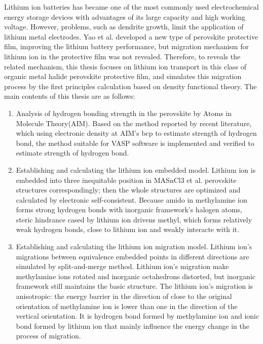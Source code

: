 \begin{eabstract}
Lithium ion batteries has became one of the most commonly used electrochemical energy storage devices with advantages of its large capacity and high working voltage. However, problems, such as dendrite growth, limit the application of lithium metal electrodes.
Yao et al. developed a new type of  perovskite protective film, improving the lithium battery performance, but migration mechanism for lithium ion in the protective film was not revealed.
Therefore, to reveals the related mechanism, this thesis focuses on lithium ion transport in this class of organic metal halide perovskite protective film, and simulates this migration process by the first principles calculation based on density functional theory.
The main contents of this thesis are as follows:
\begin{enumerate}
    \item Analysis of hydrogen bonding strength in the perovskite by Atoms in Molecule Theory(AIM). Based on the method reported by recent literature, which using electronic density at AIM's bcp to estimate strength of hydrogen bond, the method suitable for VASP software is implemented and verified to estimate strength of hydrogen bond.
    \item Establishing and calculating the lithium ion embedded model. Lithium ion is embedded into three inequitable position in MASnCl3 et al. perovskite structures correspondingly; then the whole structures are optimized and calculated by electronic self-consistent. Because amido in methylamine ion forms strong hydrogen bonds with inorganic framework's halogen atoms, steric hindrance cased by lithium ion drivens methyl, which forms relatively weak hydrogen bonds, close to lithium ion and weakly interacte with it.
    \item Establishing and calculating the lithium ion migration model. Lithium ion's migrations between equivalence embedded points in different directions are simulated by split-and-merge method. Lithium ion's migration make methylamine ions rotated and inorganic octahedrons distorted, but inorganic framework still  maintains the basic structure. The lithium ion's migration is anisotropic: the energy barrier in the direction of close to the original orientation of methylamine ion is lower than one in the direction of the vertical orientation. It is hydrogen bond formed by methylamine ion and ionic bond formed by lithium ion that mainly influence the energy change in the process of migration.
\end{enumerate}
\end{eabstract}